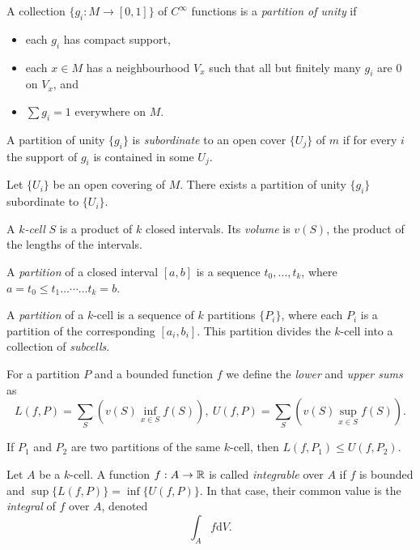 \begin{defn}
    A collection $\{g_i:M\to[0,1]\}$ of $C^\infty$ functions is a \emph{partition of
    unity} if
    \begin{itemize}
        \item each $g_i$ has compact support,
        \item each $x\in M$ has a neighbourhood $V_x$ such that all but finitely
            many $g_i$ are $0$ on $V_x$, and
        \item $\sum g_i=1$ everywhere on $M$.
    \end{itemize}

    A partition of unity $\{g_i\}$ is \emph{subordinate} to an open cover
    $\{U_j\}$ of $m$ if for every $i$ the support of $g_i$ is contained in some
    $U_j$.
\end{defn}
\begin{thm}
    Let $\{U_i\}$ be an open covering of $M$. There exists a partition of unity
    $\{g_i\}$ subordinate to $\{U_i\}$.
\end{thm}
\begin{defn}
    A \emph{$k$-cell} $S$ is a product of $k$ closed intervals. Its \emph{volume} is
    $v(S)$, the product of the lengths of the intervals.
\end{defn}
\begin{defn}
    A \emph{partition} of a closed interval $[a,b]$ is a sequence
    $t_0,\ldots,t_k$, where $a=t_0\le t_1\ldots\cdots\ldots t_k=b$.

    A \emph{partition} of a $k$-cell
    is a sequence of $k$ partitions $\{P_i\}$, where each $P_i$ is
    a partition of the corresponding $[a_i,b_i]$.
    This partition divides the $k$-cell into a collection of \emph{subcells}.
\end{defn}
\begin{defn}
    For a partition $P$ and a bounded function $f$ we define the \emph{lower} and
    \emph{upper sums} as
    \[L(f,P)=\sum_S\left(v(S)\inf_{x\in S}f(S)\right),\
    U(f,P)=\sum_S\left(v(S)\sup_{x\in S}f(S)\right).\]
\end{defn}
\begin{prop}
    If $P_1$ and $P_2$ are two partitions of the same $k$-cell, then
    $L(f,P_1)\le U(f,P_2)$.
\end{prop}
\begin{defn}
    Let $A$ be a $k$-cell. A function $f:A\to\mathbb{R}$ is called \emph{integrable}
    over $A$ if
    $f$ is bounded and $\sup\{L(f,P)\}=\inf\{U(f,P)\}$. In that case, their
    common value is the \emph{integral} of $f$ over $A$, denoted
    \[\int_A f\mathrm dV.\]
\end{defn}
